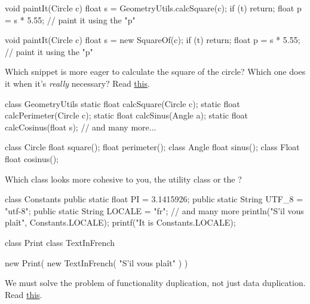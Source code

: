 \documentclass{article}
\begin{document}
\begin{pptWide}{2}
{\small\begin{ffcode}
void paintIt(Circle c) {
  float s = GeometryUtils.calcSquare(c);
  if (t) { return; }
  float p = s * 5.55;
  // paint it using the "p"
}
\end{ffcode}
}
\par\columnbreak\par
{\small\begin{ffcode}
void paintIt(Circle c) {
  float s = new SquareOf(c);
  if (t) { return; }
  float p = s * 5.55;
  // paint it using the "p"
}
\end{ffcode}
}
\end{pptWide}\par
Which snippet is more eager to calculate the square of the circle? Which one does it when it's \emph{really} necessary?
Read \href{https://www.yegor256.com/2015/02/26/composable-decorators.html}{this}.
\plush{}

\begin{pptWide}{2}
{\small\begin{ffcode}
class GeometryUtils {
  static float calcSquare(Circle c);
  static float calcPerimeter(Circle c);
  static float calcSinus(Angle a);
  static float calcCosinus(float s);
  // and many more...
}
\end{ffcode}
}
\par\columnbreak\par
{\small\begin{ffcode}
class Circle {
  float square();
  float perimeter();
}
class Angle {
  float sinus();
}
class Float {
  float cosinus();
}
\end{ffcode}
}
\end{pptWide}\par
Which class looks more cohesive to you, the utility class  or the ?
\plush{}


\begin{pptWide}{2}
{\small\begin{ffcode}
class Constants {
  public static float PI = 3.1415926;
  public static String UTF_8 = "utf-8";
  public static String LOCALE = "fr";
  // and many more
}
println("S'il vous plaît",
  Constants.LOCALE);
printf("It is %
  Constants.LOCALE);
\end{ffcode}
}
\par\columnbreak\par
{\small\begin{ffcode}
class Print { }
class TextInFrench { }

new Print(
  new TextInFrench(
    "S'il vous plaît"
  )
)
\end{ffcode}
}
\end{pptWide}\par
We must solve the problem of functionality duplication, not just data duplication.
Read \href{https://www.yegor256.com/2015/07/06/public-static-literals.html}{this}.
\plush{}
\end{document}
